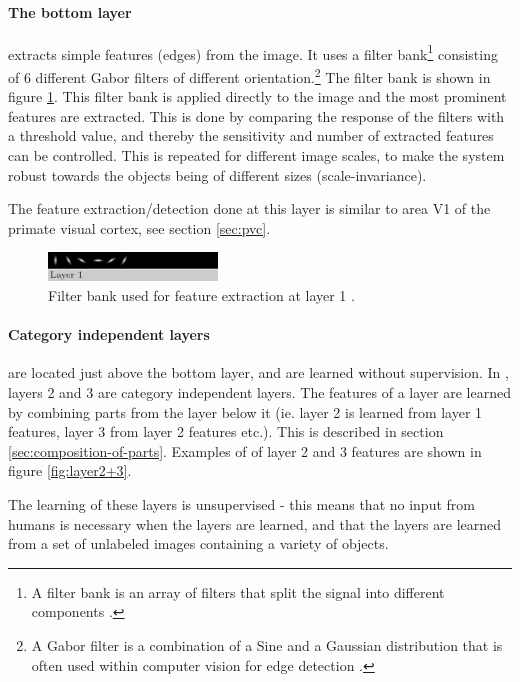 \paragraph*{The bottom layer} extracts simple features (edges) from the image.
It uses a filter bank\footnote{A filter bank is an array of filters that split the signal into different components \citep{ref:filterbank}.}
consisting of 6 different Gabor filters of different
orientation.\footnote{A Gabor filter is a combination of a Sine and a Gaussian distribution that is often used within computer vision for edge detection \citep{kamarainen2012gabor}.} 
The filter bank is shown in figure \ref{fig:filterbank}. 
This filter bank is applied directly to the image and the most prominent features are extracted. 
This is done by comparing the response of the filters with a threshold value,
and thereby the sensitivity and number of extracted features can be controlled.
This is repeated for different image scales, to make the system robust towards the objects being of different sizes (scale-invariance).

The feature extraction/detection done at this layer is similar to area V1 of the primate visual cortex, see section \ref{sec:pvc}. 

\begin{figure}[h!] %
\centering
\includegraphics[width=0.4\textwidth]{graphics/layer1_features}
\caption[Filter bank used for feature extraction]{Filter bank used for feature extraction at layer 1 \cite[fig.~7]{fidler2009learning}.}
\label{fig:filterbank}
\end{figure}

\paragraph*{Category independent layers} are located just above the bottom layer, and are learned without supervision.
In \citet{fidler2009learning}, layers 2 and 3 are category independent layers. 
The features of a layer are learned by combining parts from the layer below it
(ie. layer 2 is learned from layer 1 features, layer 3 from layer 2 features etc.).
This is described in section \ref{sec:composition-of-parts}.
Examples of of layer 2 and 3 features are shown in figure \ref{fig:layer2+3}.

The learning of these layers is unsupervised
- this means that no input from humans is necessary when the layers are learned,
and that the layers are learned from a set of unlabeled images containing a variety of objects. 

